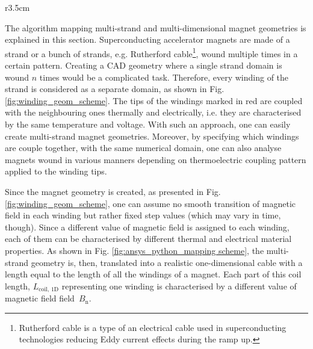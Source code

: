 
\begin{wrapfigure}{r}{3.5cm}
\centering
{}
\caption{Domain representation with multiple windings.}
\label{fig:winding_geom_scheme}
\end{wrapfigure} 

The algorithm mapping multi-strand and multi-dimensional magnet geometries is explained in this section. Superconducting accelerator magnets are made of a strand or a bunch of strands, e.g. Rutherford cable\footnote{Rutherford cable is a type of an electrical cable used in superconducting technologies reducing Eddy current effects during the ramp up.}, wound multiple times in a certain pattern. Creating a CAD geometry where a single strand domain is wound $n$ times would be a complicated task. Therefore, every winding of the strand is considered as a separate domain, as shown in Fig. \ref{fig:winding_geom_scheme}. The tips of the windings marked in red are coupled with the neighbouring ones thermally and electrically, i.e. they are characterised by the same temperature and voltage. With such an approach, one can easily create multi-strand magnet geometries. Moreover, by specifying which windings are couple together, with the same numerical domain, one can also analyse magnets wound in various manners depending on thermoelectric coupling pattern applied to the winding tips. 

Since the magnet geometry is created, as presented in Fig. \ref{fig:winding_geom_scheme}, one can assume no smooth transition of magnetic field in each winding but rather fixed step values (which may vary in time, though). Since a different value of magnetic field is assigned to each winding, each of them can be characterised by different thermal and electrical material properties. As shown in Fig. \ref{fig:ansys_python_mapping scheme}, the multi-strand geometry is, then, translated into a realistic one-dimensional cable with a length equal to the length of all the windings of a magnet. Each part of this coil length, $L_\text{coil, 1D}$ representing one winding is characterised by a different value of magnetic field field~$B_\text{n}$.

